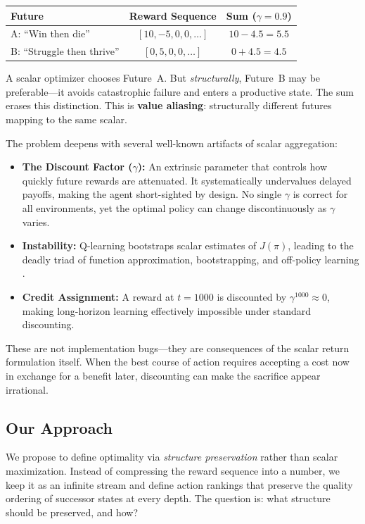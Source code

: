 \documentclass[9pt,a4paper]{article}
\theoremstyle{plain}
\theoremstyle{definition}
\theoremstyle{remark}
\begin{document}
\begin{center}
\begin{tabular}{lcc}
\textbf{Future} & \textbf{Reward Sequence} & \textbf{Sum ($\gamma{=}0.9$)} \\
\hline
A: ``Win then die'' & $[10, -5, 0, 0, \ldots]$ & $10 - 4.5 = 5.5$ \\
B: ``Struggle then thrive'' & $[0, 5, 0, 0, \ldots]$ & $0 + 4.5 = 4.5$ \\
\end{tabular}
\end{center}

A scalar optimizer chooses Future~A.  But \emph{structurally}, Future~B may be preferable---it avoids catastrophic failure and enters a productive state.  The sum erases this distinction.  This is \textbf{value aliasing}: structurally different futures mapping to the same scalar.

The problem deepens with several well-known artifacts of scalar aggregation:
\begin{itemize}
\item \textbf{The Discount Factor ($\gamma$):} An extrinsic parameter that controls how quickly future rewards are attenuated.  It systematically undervalues delayed payoffs, making the agent short-sighted by design.  No single $\gamma$ is correct for all environments, yet the optimal policy can change discontinuously as $\gamma$ varies.
\item \textbf{Instability:} Q-learning bootstraps scalar estimates of $J(\pi)$, leading to the deadly triad of function approximation, bootstrapping, and off-policy learning \cite{Sutton2018}.
\item \textbf{Credit Assignment:} A reward at $t{=}1000$ is discounted by $\gamma^{1000} \approx 0$, making long-horizon learning effectively impossible under standard discounting.
\end{itemize}

\noindent These are not implementation bugs---they are consequences of the scalar return formulation itself.  When the best course of action requires accepting a cost now in exchange for a benefit later, discounting can make the sacrifice appear irrational.

\subsection{Our Approach}

We propose to define optimality via \emph{structure preservation} rather than scalar maximization.  Instead of compressing the reward sequence into a number, we keep it as an infinite stream and define action rankings that preserve the quality ordering of successor states at every depth.  The question is: what structure should be preserved, and how?
\end{document}

